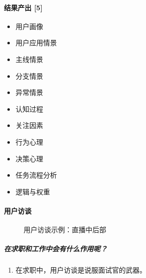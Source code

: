 \documentclass[letterpaper,10pt,english]{sphinxmanual}
\begin{document}
\paragraph{结果产出 {[}5{]}}
\label{\detokenize{chapter_knowledge/users_analysis:id32}}\label{\detokenize{chapter_knowledge/users_analysis:id33}}\begin{itemize}
\item {} 
用户画像

\item {} 
用户应用情景

\item {} 
主线情景

\item {} 
分支情景

\item {} 
异常情景

\item {} 
认知过程

\item {} 
关注因素

\item {} 
行为心理

\item {} 
决策心理

\item {} 
任务流程分析

\item {} 
逻辑与权重

\end{itemize}


\paragraph{用户访谈}
\label{\detokenize{chapter_knowledge/users_analysis:id34}}
\begin{figure}[H]
\centering
\capstart

\noindent{}
\caption{用户访谈示例：直播中后部}\label{\detokenize{chapter_knowledge/users_analysis:id46}}\end{figure}


\subparagraph{在求职和工作中会有什么作用呢？}
\label{\detokenize{chapter_knowledge/users_analysis:id35}}\begin{enumerate}
%
\item {} 
在求职中，用户访谈是说服面试官的武器。

\end{enumerate}
\end{document}
